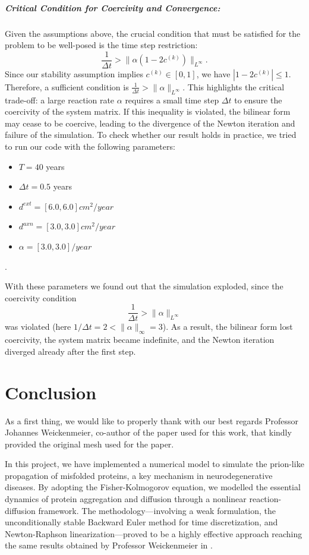 \documentclass[12pt, a4paper, twoside, openright]{report}
\begin{document}
\paragraph{Critical Condition for Coercivity and Convergence:}
Given the assumptions above, the crucial condition that must be satisfied for the problem to be well-posed is the time step restriction:
\[
\frac{1}{\Delta t} > \|\alpha (1 - 2c^{(k)})\|_{L^\infty}.
\]
Since our stability assumption implies $c^{(k)} \in [0,1]$, we have $|1-2c^{(k)}| \le 1$. Therefore, a sufficient condition is $\frac{1}{\Delta t} > \|\alpha\|_{L^\infty}$. This highlights the critical trade-off: a large reaction rate $\alpha$ requires a small time step $\Delta t$ to ensure the coercivity of the system matrix. If this inequality is violated, the bilinear form may cease to be coercive, leading to the divergence of the Newton iteration and failure of the simulation.
To check whether our result holds in practice, we tried to run our code with the following parameters:
 \begin{itemize}
     \item \( T = 40 \) years
     \item \( \Delta t = 0.5 \) years
     \item \( d^{ext} = [6.0, 6.0] cm^2/year\)
     \item \( d^{axn} = [3.0, 3.0] cm^2/year\)
     \item \( \alpha = [3.0, 3.0] /year\)
 \end{itemize}.

With these parameters we found out that the simulation exploded, since the coercivity condition 
\[
\frac{1}{\Delta t} > \|\alpha\|_{L^\infty}
\]
was violated (here $1/\Delta t = 2 < \|\alpha\|_\infty = 3$). As a result, the bilinear form lost coercivity, the system matrix became indefinite, and the Newton iteration diverged already after the first step.

 \chapter{Conclusion}
As a first thing, we would like to properly thank with our best regards Professor Johannes Weickenmeier, co-author of the paper used for this work, that kindly provided the original mesh used for the paper.

In this project, we have implemented a numerical model to simulate the prion-like propagation of misfolded proteins, a key mechanism in neurodegenerative diseases. By adopting the Fisher-Kolmogorov equation, we modelled the essential dynamics of protein aggregation and diffusion through a nonlinear reaction-diffusion framework. The methodology—involving a weak formulation, the unconditionally stable Backward Euler method for time discretization, and Newton-Raphson linearization—proved to be a highly effective approach reaching the same results obtained by Professor Weickenmeier in \cite{WEICKENMEIER2019264}.
\end{document}
